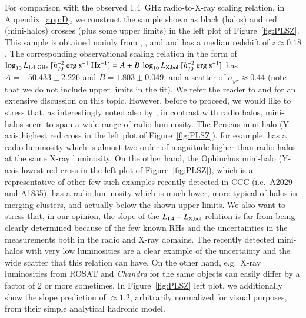 \documentclass[traditabstract]{aa}
\newcommand{\rmn}{\mathrm}
\begin{document}
For comparison with the observed 1.4~GHz radio-to-X-ray scaling relation, in Appendix~\ref{app:D}, we construct the sample shown as black (halos) and red (mini-halos) crosses (plus some upper limits) in the left plot of Figure~\ref{fig:PLSZ}. This sample is obtained mainly from \cite{2009A&A...507..661B}, \cite{2011A&A...527A..99E},  and \cite{2009A&A...499..371G} and has a median redshift of $z\approx0.18$. The corresponding observational scaling relation in the form of $\log_{10} L_{1.4~\rmn{GHz}}~[h_{70}^{-2}~\rmn{erg}~\rmn{s}^{-1}~\rmn{Hz}^{-1}] = A + B~\log_{10} L_{\rm{X,bol}}~[h_{70}^{-2}~\rmn{erg}~\rmn{s}^{-1}]$ has $A=-50.433\pm2.226$ and $B=1.803\pm0.049$, and a scatter of $\sigma_{yx} \approx 0.44$ (note that we do not include upper limits in the fit). We refer the reader to \cite{2009A&A...507..661B} and \cite{2011A&A...527A..99E} for an extensive discussion on this topic. However, before to proceed, we would like to stress that, as interestingly noted also by \cite{2009A&A...499..679M}, in contrast with radio halos, mini-halos seem to span a wide range of radio luminosity. The Perseus mini-halo (Y-axis highest red cross in the left plot of Figure~\ref{fig:PLSZ}), for example, has a radio luminosity which is almost two order of magnitude higher than radio halos at the same X-ray luminosity. On the other hand, the Ophiuchus mini-halo (Y-axis lowest red cross in the left plot of Figure~\ref{fig:PLSZ}), which is a representative of other few such examples recently detected in CCC (i.e.~A2029 and A1835), has a radio luminosity which is much lower, more typical of halos in merging clusters, and actually below the shown upper limits. We also want to stress that, in our opinion, the slope of the $L_{1.4}-L_{\rm{X,bol}}$ relation is far from being clearly determined because of the few known RHs and the uncertainties in the measurements both in the radio  and X-ray domains. The recently detected mini-halos with very low luminosities are a clear example of the uncertainty and the wide scatter that this relation can have. On the other hand, e.g.~X-ray luminosities from ROSAT and \emph{Chandra} for the same objects can easily differ by a factor of 2 or more sometimes. In Figure~\ref{fig:PLSZ} left plot, we additionally show the \cite{2009JCAP...09..024K} slope prediction of $\approx1.2$, arbitrarily normalized for visual purposes, from their simple analytical hadronic model.
\end{document}

